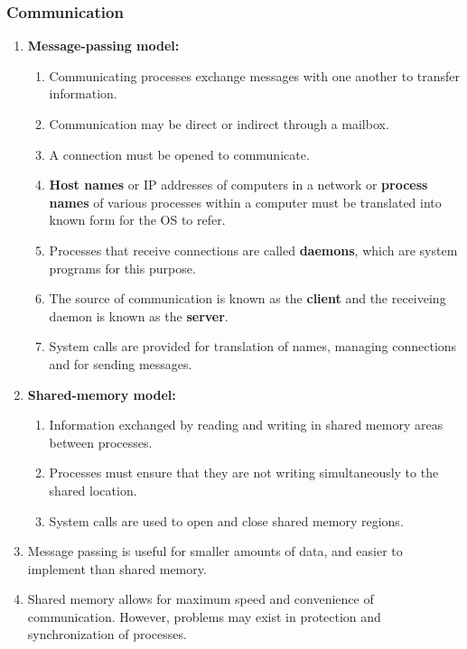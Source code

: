 \documentclass[journal,12pt,twocolumn]{IEEEtran}
\begin{document}
\subsubsection{Communication}
\begin{enumerate}
    \item \textbf{Message-passing model:}
    \begin{enumerate}
        \item Communicating processes exchange messages with one another to
        transfer information.
        \item Communication may be direct or indirect through a mailbox.
        \item A connection must be opened to communicate. 
        \item \textbf{Host names} or IP addresses of computers in a network or 
        \textbf{process names} of various processes within a computer must be 
        translated into known form for the OS to refer.
        \item Processes that receive connections are called \textbf{daemons}, 
        which are system programs for this purpose.
        \item The source of communication is known as the \textbf{client} and 
        the receiveing daemon is known as the \textbf{server}.
        \item System calls are provided for translation of names, managing 
        connections and for sending messages.
    \end{enumerate}
    \item \textbf{Shared-memory model:}
    \begin{enumerate}
        \item Information exchanged by reading and writing in shared memory 
        areas between processes.
        \item Processes must ensure that they are not writing simultaneously 
        to the shared location.
        \item System calls are used to open and close shared memory regions.
    \end{enumerate}
    \item Message passing is useful for smaller amounts of data, and easier to
    implement than shared memory.
    \item Shared memory allows for maximum speed and convenience of communication.
    However, problems may exist in protection and synchronization of processes.
\end{enumerate}
\end{document}
